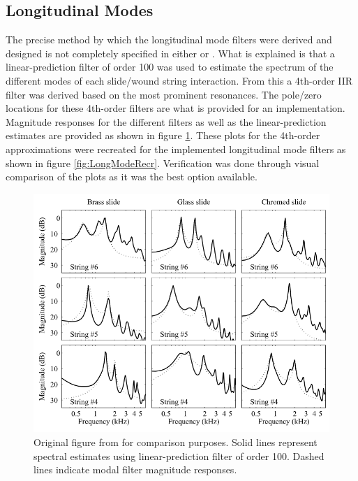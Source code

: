 \documentclass[../main.tex]{subfiles}
\begin{document}
\subsection{Longitudinal Modes}
The precise method by which the longitudinal mode filters were derived and designed is not completely specified in either  or . What is explained is that a linear-prediction filter of order 100 was used to estimate the spectrum of the different modes of each slide/wound string interaction. From this a 4th-order IIR filter was derived based on the most prominent resonances. The pole/zero locations for these 4th-order filters are what is provided for an implementation. Magnitude responses for the different filters as well as the linear-prediction estimates are provided as shown in figure \ref{fig:LongModeOrig}. These plots for the 4th-order approximations were recreated for the implemented longitudinal mode filters as shown in figure \ref{fig:LongModeRecr}. Verification was done through visual comparison of the plots as it was the best option available.

\begin{figure}[h]
    \centering
    \includegraphics[scale=.65]{./images/plots/LongitudinalModeFiltersOriginal.png}
    \caption{Original figure from  for comparison purposes. Solid lines represent spectral estimates using linear-prediction filter of order 100. Dashed lines indicate modal filter magnitude responses.}
    \label{fig:LongModeOrig}
\end{figure}
\end{document}
